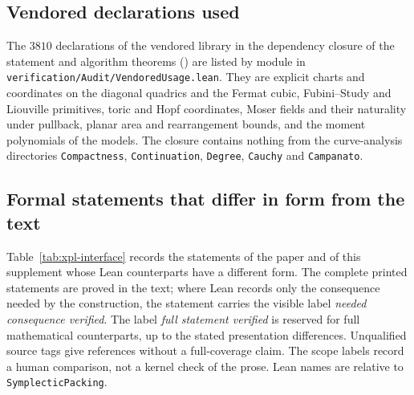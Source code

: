 \subsection{Vendored declarations used}\label{sec:xpl-vendored}

The $3810$ declarations of the vendored library in the dependency closure of the statement and algorithm theorems
() are listed by module in \texttt{verification/Audit/VendoredUsage.lean}. They are explicit charts and
coordinates on the diagonal quadrics and the Fermat cubic, Fubini--Study and Liouville primitives, toric and Hopf
coordinates, Moser fields and their naturality under pullback, planar area and rearrangement bounds, and the moment
polynomials of the models. The closure contains nothing from the curve-analysis directories \texttt{Compactness}, \texttt{Continuation},
\texttt{Degree}, \texttt{Cauchy} and \texttt{Campanato}.

\endgroup

\subsection{Formal statements that differ in form from the text}\label{sec:xpl-interface}

Table~\ref{tab:xpl-interface} records the statements of the paper and of this supplement whose Lean counterparts have a
different form. The complete printed statements are proved in the text; where Lean records only the consequence
needed by the construction, the statement carries the visible label \emph{needed consequence verified}.
The label \emph{full statement verified} is reserved for full mathematical counterparts, up to the stated
presentation differences. Unqualified source tags give references without a full-coverage claim. The scope labels
record a human comparison, not a kernel check of the prose. Lean names are relative to \texttt{SymplecticPacking}.

